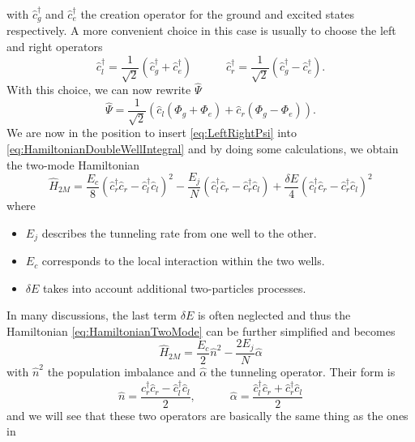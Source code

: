 \documentclass{article}
\begin{document}
with $\hat{c}_g^{\dagger} $ and $\hat{c}_e^{\dagger} $ the creation operator for the ground and excited states respectively.
A more convenient choice in this case is usually to choose the left and right operators
\begin{equation}
	\label{eq:LeftRightOperators}
	\hat{c}_l^{\dagger} = \frac{1}{\sqrt{2}  }\left( \hat{c}_g^{\dagger} + \hat{c}_e^{\dagger} \right)   \hspace{3em}\hat{c}_r^{\dagger} = \frac{1}{\sqrt{2}  }\left( \hat{c}_g^{\dagger} - \hat{c}_e^{\dagger} \right)  .
\end{equation}
With this choice, we can now rewrite $ \hat{\Psi} $
\begin{equation}
	\label{eq:LeftRightPsi}
	\hat{\Psi} = \frac{1}{\sqrt{2}}\left( \hat{c}_l(\Phi_g + \Phi_e) + \hat{c}_r(\Phi_g - \Phi_e) \right).
\end{equation}
We are now in the position to insert \cref{eq:LeftRightPsi} into \cref{eq:HamiltonianDoubleWellIntegral} and by doing some calculations, we obtain the two-mode Hamiltonian
\begin{equation}
	\label{eq:HamiltonianTwoMode}
	\hat{H}_{2M} = \frac{E_{c}}{8}\left(\hat{c}_{r}^\dagger\hat{c}_{r} - \hat{c}_{l}^\dagger\hat{c}_{l}\right)^2 - \frac{ E_{j} }{N} \left(\hat{c}_{l}^\dagger\hat{c}_{r} - \hat{c}_{r}^\dagger\hat{c}_{l}\right) + \frac{\delta E}{4} \left(\hat{c}_{l}^\dagger\hat{c}_{r} - \hat{c}_{r}^\dagger\hat{c}_{l}\right)^{2}
\end{equation}
where
\begin{itemize}
	\item $ E_{j} $ describes the tunneling rate from one well to the other.
	\item $ E_{c} $ corresponds to the local interaction within the two wells.
	\item $ \delta E $ takes into account additional two-particles processes.
\end{itemize}
In many discussions, the last term $ \delta E $ is often neglected and thus the Hamiltonian \cref{eq:HamiltonianTwoMode} can be further simplified and becomes
\begin{equation}
	\label{eq:HamiltonianTwoModeFinal}
	\hat{H}_{2M} = \frac{E_{c}}{2} \hat{n}^2 - \frac{2E_{j}}{N}\hat{\alpha}
\end{equation}
with $ \hat{n}^2 $ the population imbalance and $\hat{\alpha}$ the tunneling operator.
Their form is
\begin{equation}
	\label{eq:JosephsonJuncitionOperators}
	\hat{n} = \frac{\hat{c}_{r}^\dagger\hat{c}_{r} - \hat{c}_{l}^\dagger\hat{c}_{l}}{2}, \hspace{3em} \hat{ \alpha } = \frac{ \hat{c}_{l}^\dagger\hat{c}_{r} + \hat{c}_{r}^\dagger\hat{c}_{l}}{2}
\end{equation}
and we will see that these two operators are basically the same thing as the ones in  \cite{FastGenerationJulia2012}
\newpage
\end{document}
